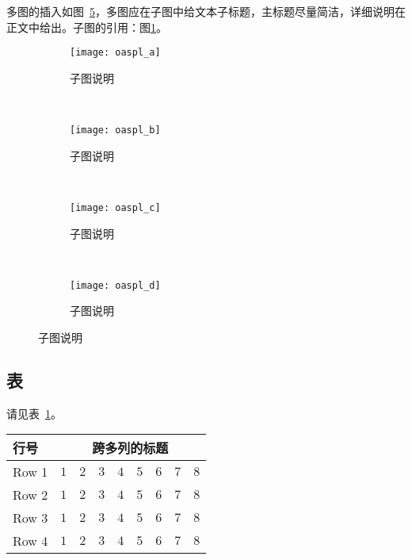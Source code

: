 多图的插入如图~\ref{fig:oaspl}，多图应在子图中给文本子标题，主标题尽量简洁，详细说明在正文中给出。子图的引用：图\ref{fig:oaspl_a}。
\begin{figure}[!htbp]
    \centering
    \begin{subfigure}[b]{0.35\textwidth}
      \texttt{[image: oaspl\_a]}
      \caption{子图说明}
      \label{fig:oaspl_a}
    \end{subfigure}%
    ~%
    \begin{subfigure}[b]{0.35\textwidth}
      \texttt{[image: oaspl\_b]}
      \caption{子图说明}
      \label{fig:oaspl_b}
    \end{subfigure}
    \\%
    \begin{subfigure}[b]{0.35\textwidth}
      \texttt{[image: oaspl\_c]}
      \caption{子图说明}
      \label{fig:oaspl_c}
    \end{subfigure}%
    ~%
    \begin{subfigure}[b]{0.35\textwidth}
      \texttt{[image: oaspl\_d]}
      \caption{子图说明}
      \label{fig:oaspl_d}
    \end{subfigure}
    \label{fig:oaspl}
\end{figure}

\subsection{表}

请见表~\ref{tab:sample}。
\begin{table}[htbp]
    \label{tab:sample}
    \centering
    \footnotesize%
    \setlength{\tabcolsep}{4pt}%
    \renewcommand{\arraystretch}{1.2}%
    \begin{tabular}{lcccccccc}
        \hline
        行号 & \multicolumn{8}{c}{跨多列的标题}\\
        \hline
        Row 1 & $1$ & $2$ & $3$ & $4$ & $5$ & $6$ & $7$ & $8$\\
        Row 2 & $1$ & $2$ & $3$ & $4$ & $5$ & $6$ & $7$ & $8$\\
        Row 3 & $1$ & $2$ & $3$ & $4$ & $5$ & $6$ & $7$ & $8$\\
        Row 4 & $1$ & $2$ & $3$ & $4$ & $5$ & $6$ & $7$ & $8$\\
        \hline
    \end{tabular}
\end{table}

